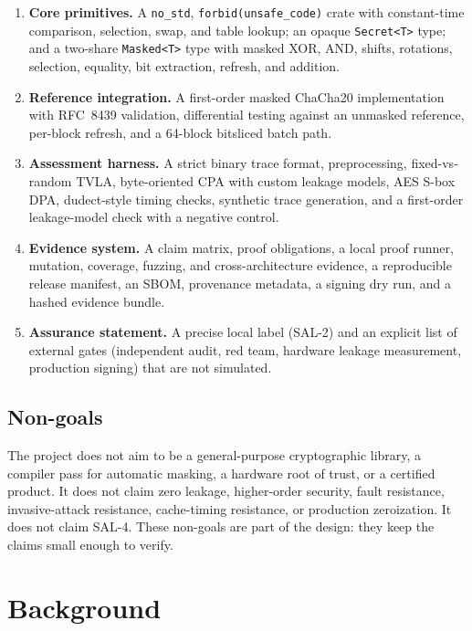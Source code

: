 \documentclass[11pt,a4paper]{article}
\newcommand{\code}[1]{\texttt{#1}}
\theoremstyle{plain}
\theoremstyle{definition}
\theoremstyle{remark}
\begin{document}
\begin{enumerate}[leftmargin=1.5em]
  \item \textbf{Core primitives.} A \code{no\_std}, \code{forbid(unsafe\_code)} crate with
        constant-time comparison, selection, swap, and table lookup; an opaque
        \code{Secret<T>} type; and a two-share \code{Masked<T>} type with masked XOR,
        AND, shifts, rotations, selection, equality, bit extraction, refresh, and
        addition.
  \item \textbf{Reference integration.} A first-order masked ChaCha20 implementation
        with RFC~8439 validation, differential testing against an unmasked reference,
        per-block refresh, and a 64-block bitsliced batch path.
  \item \textbf{Assessment harness.} A strict binary trace format, preprocessing,
        fixed-vs-random TVLA, byte-oriented CPA with custom leakage models, AES S-box
        DPA, dudect-style timing checks, synthetic trace generation, and a
        first-order leakage-model check with a negative control.
  \item \textbf{Evidence system.} A claim matrix, proof obligations, a local proof
        runner, mutation, coverage, fuzzing, and cross-architecture evidence, a
        reproducible
        release manifest, an SBOM, provenance metadata, a signing dry run, and a
        hashed evidence bundle.
  \item \textbf{Assurance statement.} A precise local label (SAL-2) and an explicit list
        of external gates (independent audit, red team, hardware leakage measurement,
        production signing) that are not simulated.
\end{enumerate}

\subsection{Non-goals}

The project does not aim to be a general-purpose cryptographic library, a compiler pass
for automatic masking, a hardware root of trust, or a certified product. It does not
claim zero leakage, higher-order security, fault resistance, invasive-attack resistance,
cache-timing resistance, or production zeroization. It does not claim SAL-4. These
non-goals are part of the design: they keep the claims small enough to verify.

\section{Background}\label{sec:background}
\end{document}
